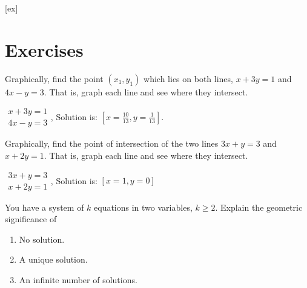 [ex]
\section*{Exercises}

\begin{enumialphparenastyle}

\begin{ex}
Graphically, find the point $\left( x_{1},y_{1}\right) $ which
lies on both lines, $x+3y=1$ and $4x-y=3.$  That is, graph each line
and see where they intersect.

\begin{sol}
$\begin{array}{c}
x+3y=1 \\
4x-y=3
\end{array}$, Solution is: $\left[ x=\frac{10}{13},y=\frac{1}{13}\right] $.
\end{sol}
\end{ex}


\begin{ex}
Graphically, find the point of intersection of the two lines $
3x+y=3$ and $x+2y=1.$ That is, graph each line
and see where they intersect. 

\begin{sol}
$\begin{array}{c}
3x+y=3 \\
x+2y=1
\end{array}
$, Solution is: $\left[ x=1,y=0\right] $
\end{sol}
\end{ex}

\begin{ex} You have a system of $k$ equations in two variables, $k\geq 2$.
Explain the geometric significance of

\begin{enumerate}
\item No solution.

\item A unique solution.

\item An infinite number of solutions.
\end{enumerate}

\end{ex}

\end{enumialphparenastyle}